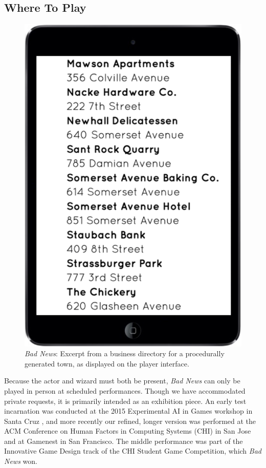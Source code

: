 \documentclass[letterpaper]{article}
\begin{document}
\subsection{Where To Play}

\begin{figure}[t]
  \centering
  \includegraphics[width=0.42\columnwidth]{images/bad_news-player_interface}
  \caption{\textit{Bad News}: Excerpt from a business directory for a procedurally generated town, as displayed on the player interface.}
  \label{fig:bn-player_interface}
\end{figure}

Because the actor and wizard must both be present, \textit{Bad News} can only be played in person at scheduled performances. Though we have accommodated private requests, it is primarily intended as an exhibition piece. An early test incarnation was conducted at the 2015 Experimental AI in Games workshop in Santa Cruz \cite{ryan2015bad}, and more recently our refined, longer version was performed at the ACM Conference on Human Factors in Computing Systems (CHI) in San Jose \cite{ryan2016bad} and at Gamenest in San Francisco. The middle performance was part of the Innovative Game Design track of the CHI Student Game Competition, which \textit{Bad News} won.









\end{document}
